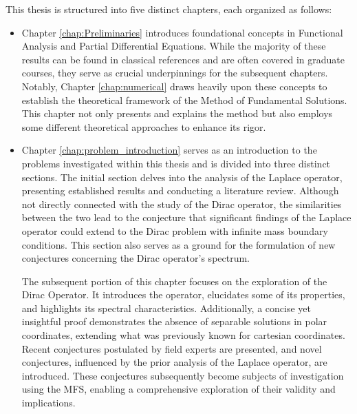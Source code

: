 This thesis is structured into five distinct chapters, each organized as follows:
\begin{itemize}
\item Chapter \ref{chap:Preliminaries} introduces foundational concepts in Functional Analysis and Partial Differential Equations. While the majority of these results can be found in classical references and are often covered in graduate courses, they serve as crucial underpinnings for the subsequent chapters. Notably, Chapter \ref{chap:numerical} draws heavily upon these concepts to establish the theoretical framework of the Method of Fundamental Solutions. This chapter not only presents and explains the method but also employs some different theoretical approaches to enhance its rigor.
\item Chapter \ref{chap:problem_introduction} serves as an introduction to the problems investigated within this thesis and is divided into three distinct sections. The initial section delves into the analysis of the Laplace operator, presenting established results and conducting a literature review. Although not directly connected with the study of the Dirac operator, the similarities between the two lead to the conjecture that significant findings of the Laplace operator could extend to the Dirac problem with infinite mass boundary conditions. This section also serves as a ground for the formulation of new conjectures concerning the Dirac operator's spectrum.

The subsequent portion of this chapter focuses on the exploration of the Dirac Operator. It introduces the operator, elucidates some of its properties, and highlights its spectral characteristics. Additionally, a concise yet insightful proof demonstrates the absence of separable solutions in polar coordinates, extending what was previously known for cartesian coordinates. Recent conjectures postulated by field experts are presented, and novel conjectures, influenced by the prior analysis of the Laplace operator, are introduced. These conjectures subsequently become subjects of investigation using the \ac{MFS}, enabling a comprehensive exploration of their validity and implications.


\end{itemize}
